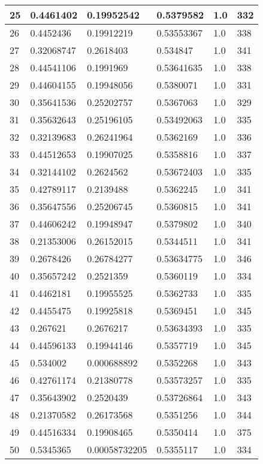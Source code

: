 \begin{longtable}{|l|l|l|l|l|l|}
25 & 0.4461402 & 0.19952542 & 0.5379582 & 1.0 & 332 \\ \hline 
26 & 0.4452436 & 0.19912219 & 0.53553367 & 1.0 & 338 \\ \hline 
27 & 0.32068747 & 0.2618403 & 0.534847 & 1.0 & 341 \\ \hline 
28 & 0.44541106 & 0.1991969 & 0.53641635 & 1.0 & 338 \\ \hline 
29 & 0.44604155 & 0.19948056 & 0.5380071 & 1.0 & 331 \\ \hline 
30 & 0.35641536 & 0.25202757 & 0.5367063 & 1.0 & 329 \\ \hline 
31 & 0.35632643 & 0.25196105 & 0.53492063 & 1.0 & 335 \\ \hline 
32 & 0.32139683 & 0.26241964 & 0.5362169 & 1.0 & 336 \\ \hline 
33 & 0.44512653 & 0.19907025 & 0.5358816 & 1.0 & 337 \\ \hline 
34 & 0.32144102 & 0.2624562 & 0.53672403 & 1.0 & 335 \\ \hline 
35 & 0.42789117 & 0.2139488 & 0.5362245 & 1.0 & 341 \\ \hline 
36 & 0.35647556 & 0.25206745 & 0.5360815 & 1.0 & 341 \\ \hline 
37 & 0.44606242 & 0.19948947 & 0.5379802 & 1.0 & 340 \\ \hline 
38 & 0.21353006 & 0.26152015 & 0.5344511 & 1.0 & 341 \\ \hline 
39 & 0.2678426 & 0.26784277 & 0.53634775 & 1.0 & 346 \\ \hline 
40 & 0.35657242 & 0.2521359 & 0.5360119 & 1.0 & 334 \\ \hline 
41 & 0.4462181 & 0.19955525 & 0.5362733 & 1.0 & 335 \\ \hline 
42 & 0.4455475 & 0.19925818 & 0.5369451 & 1.0 & 345 \\ \hline 
43 & 0.267621 & 0.2676217 & 0.53634393 & 1.0 & 335 \\ \hline 
44 & 0.44596133 & 0.19944146 & 0.5357719 & 1.0 & 345 \\ \hline 
45 & 0.534002 & 0.000688892 & 0.5352268 & 1.0 & 343 \\ \hline 
46 & 0.42761174 & 0.21380778 & 0.53573257 & 1.0 & 335 \\ \hline 
47 & 0.35643902 & 0.2520439 & 0.53726864 & 1.0 & 343 \\ \hline 
48 & 0.21370582 & 0.26173568 & 0.5351256 & 1.0 & 344 \\ \hline 
49 & 0.44516334 & 0.19908465 & 0.5350414 & 1.0 & 375 \\ \hline 
50 & 0.5345365 & 0.00058732205 & 0.5355117 & 1.0 & 334 \\ \hline 
\end{longtable}
